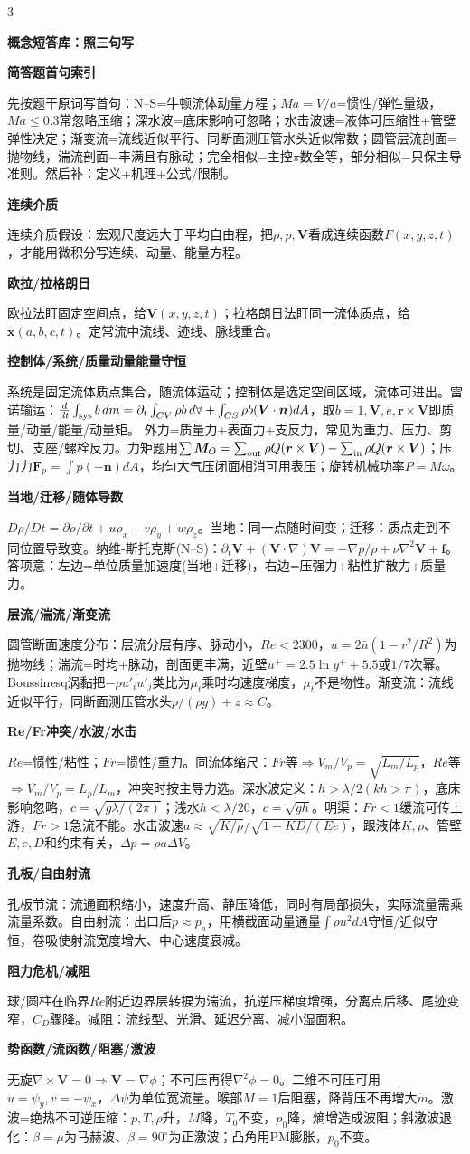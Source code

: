 \documentclass[a4paper]{article}
\newcommand{\qt}[1]{\vspace{0.25pt}\colorbox{Q}{\parbox{\dimexpr\linewidth-2\fboxsep}{\color{white}\bfseries #1}}\par}
\newcommand{\sect}[1]{\qt{#1}}
\begin{document}
\begin{multicols}{3}
{\sect{概念短答库：照三句写}
\sect{简答题首句索引}
先按题干原词写首句：N--S=牛顿流体动量方程；$Ma=V/a$=惯性/弹性量级，$Ma\le0.3$常忽略压缩；深水波=底床影响可忽略；水击波速=液体可压缩性+管壁弹性决定；渐变流=流线近似平行、同断面测压管水头近似常数；圆管层流剖面=抛物线，湍流剖面=丰满且有脉动；完全相似=主控$\pi$数全等，部分相似=只保主导准则。然后补：定义+机理+公式/限制。
\sect{连续介质}
连续介质假设：宏观尺度远大于平均自由程，把$\rho,p,\bm V$看成连续函数$F(x,y,z,t)$，才能用微积分写连续、动量、能量方程。
\sect{欧拉/拉格朗日}
欧拉法盯固定空间点，给$\bm V(x,y,z,t)$；拉格朗日法盯同一流体质点，给$\bm x(a,b,c,t)$。定常流中流线、迹线、脉线重合。
\sect{控制体/系统/质量动量能量守恒}
系统是固定流体质点集合，随流体运动；控制体是选定空间区域，流体可进出。雷诺输运：$\frac d{dt}\int_{\rm sys}b\,dm=\partial_t\int_{CV}\rho b\,d\forall+\int_{CS}\rho b(\bm V\cdot\bm n)dA$，取$b=1,\bm V,e,\bm r\times\bm V$即质量/动量/能量/动量矩。
外力=质量力+表面力+支反力，常见为重力、压力、剪切、支座/螺栓反力。力矩题用$\sum \bm M_O=\sum_{\rm out}\rho Q(\bm r\times\bm V)-\sum_{\rm in}\rho Q(\bm r\times\bm V)$；压力力$\bm F_p=\int p(-\bm n)dA$，均匀大气压闭面相消可用表压；旋转机械功率$P=M\omega$。
\sect{当地/迁移/随体导数}
$D\rho/Dt=\partial\rho/\partial t+u\rho_x+v\rho_y+w\rho_z$。当地：同一点随时间变；迁移：质点走到不同位置导致变。纳维-斯托克斯(N--S)：$\partial_t\bm V+(\bm V\cdot\nabla)\bm V=-\nabla p/\rho+\nu\nabla^2\bm V+\bm f$。答项意：左边=单位质量加速度(当地+迁移)，右边=压强力+粘性扩散力+质量力。
\sect{层流/湍流/渐变流}
圆管断面速度分布：层流分层有序、脉动小，$Re<2300$，$u=2\bar u(1-r^2/R^2)$为抛物线；湍流=时均+脉动，剖面更丰满，近壁$u^+=2.5\ln y^++5.5$或$1/7$次幂。Boussinesq涡黏把$-\rho\overline{u'_iu'_j}$类比为$\mu_t$乘时均速度梯度，$\mu_t$不是物性。渐变流：流线近似平行，同断面测压管水头$p/(\rho g)+z\approx C$。
\sect{Re/Fr冲突/水波/水击}
$Re$=惯性/粘性；$Fr$=惯性/重力。同流体缩尺：$Fr$等$\Rightarrow V_m/V_p=\sqrt{L_m/L_p}$，$Re$等$\Rightarrow V_m/V_p=L_p/L_m$，冲突时按主导力选。深水波定义：$h>\lambda/2(kh>\pi)$，底床影响忽略，$c=\sqrt{g\lambda/(2\pi)}$；浅水$h<\lambda/20$，$c=\sqrt{gh}$。明渠：$Fr<1$缓流可传上游，$Fr>1$急流不能。水击波速$a\approx\sqrt{K/\rho}/\sqrt{1+KD/(Ee)}$，跟液体$K,\rho$、管壁$E,e,D$和约束有关，$\Delta p=\rho a\Delta V$。
\sect{孔板/自由射流}
孔板节流：流通面积缩小，速度升高、静压降低，同时有局部损失，实际流量需乘流量系数。自由射流：出口后$p\approx p_a$，用横截面动量通量$\int\rho u^2dA$守恒/近似守恒，卷吸使射流宽度增大、中心速度衰减。
\sect{阻力危机/减阻}
球/圆柱在临界$Re$附近边界层转捩为湍流，抗逆压梯度增强，分离点后移、尾迹变窄，$C_D$骤降。减阻：流线型、光滑、延迟分离、减小湿面积。
\sect{势函数/流函数/阻塞/激波}
无旋$\nabla\times\bm V=0\Rightarrow\bm V=\nabla\phi$；不可压再得$\nabla^2\phi=0$。二维不可压可用$u=\psi_y,v=-\psi_x$，$\Delta\psi$为单位宽流量。喉部$M=1$后阻塞，降背压不再增大$\dot m$。激波=绝热不可逆压缩：$p,T,\rho$升，$M$降，$T_0$不变，$p_0$降，熵增造成波阻；斜激波退化：$\beta=\mu$为马赫波、$\beta=90^\circ$为正激波；凸角用PM膨胀，$p_0$不变。

}
\end{multicols}
\end{document}
